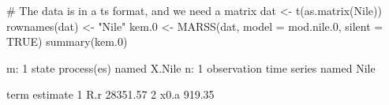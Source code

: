 \begin{Schunk}
\begin{Sinput}
 # The data is in a ts format, and we need a matrix
 dat <- t(as.matrix(Nile))
 rownames(dat) <- "Nile"
 kem.0 <- MARSS(dat, model = mod.nile.0, silent = TRUE)
 summary(kem.0)
\end{Sinput}
\begin{Soutput}
m: 1 state process(es) named X.Nile
n: 1 observation time series named Nile

  term estimate
1  R.r 28351.57
2 x0.a   919.35
\end{Soutput}
\end{Schunk}
